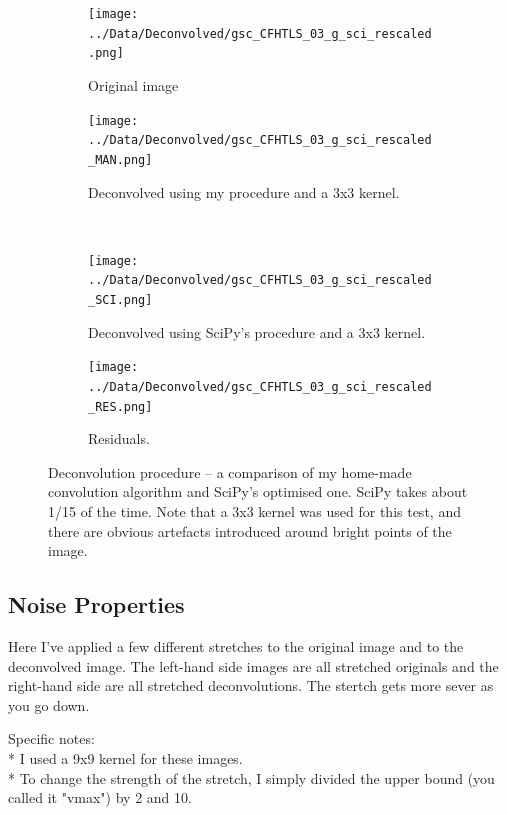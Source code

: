 \documentclass[letterpaper, 11pt]{article}
\begin{document}
\begin{figure}
	\def\width{0.3\textwidth}
	\centering
	\begin{subfigure}{\width}
		\texttt{[image: ../Data/Deconvolved/gsc\_CFHTLS\_03\_g\_sci\_rescaled.png]}
		\caption{Original image}
	\end{subfigure}
	
	\begin{subfigure}{\width}
		\texttt{[image: ../Data/Deconvolved/gsc\_CFHTLS\_03\_g\_sci\_rescaled\_MAN.png]}
		\caption{Deconvolved using my procedure and a 3x3 kernel.}
	\end{subfigure}
	~
	\begin{subfigure}{\width}
		\texttt{[image: ../Data/Deconvolved/gsc\_CFHTLS\_03\_g\_sci\_rescaled\_SCI.png]}
		\caption{Deconvolved using SciPy's procedure and a 3x3 kernel.}
	\end{subfigure}
	
	\begin{subfigure}{\width}
		\texttt{[image: ../Data/Deconvolved/gsc\_CFHTLS\_03\_g\_sci\_rescaled\_RES.png]}
		\caption{Residuals.}
	\end{subfigure}
	\caption{Deconvolution procedure -- a comparison of my home-made convolution algorithm and SciPy's optimised one. SciPy takes about 1/15 of the time. Note that a 3x3 kernel was used for this test, and there are obvious artefacts introduced around bright points of the image.}
	\label{fig:deconvolution_comparison}
\end{figure}


\subsection{Noise Properties}

Here I've applied a few different stretches to the original image and to the deconvolved image. The left-hand side images are all stretched originals and the right-hand side are all stretched deconvolutions. The stertch gets more sever as you go down.


Specific notes:\\
* I used a 9x9 kernel for these images.\\
* To change the strength of the stretch, I simply divided the upper bound (you called it "vmax") by 2 and 10.\\


\end{document}
